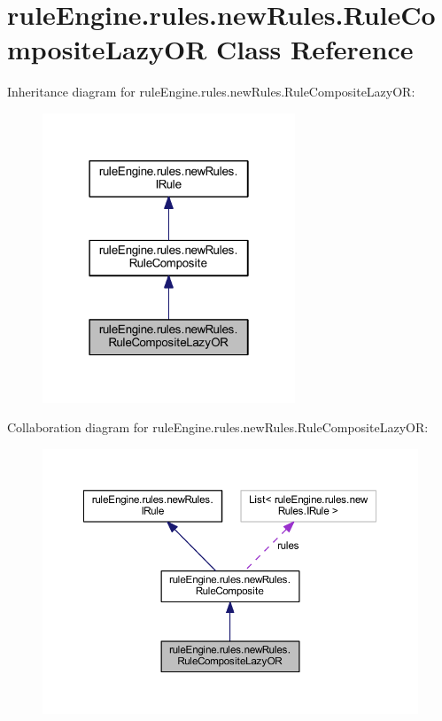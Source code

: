 \hypertarget{classrule_engine_1_1rules_1_1new_rules_1_1_rule_composite_lazy_o_r}{}\section{rule\+Engine.\+rules.\+new\+Rules.\+Rule\+Composite\+Lazy\+OR Class Reference}
\label{classrule_engine_1_1rules_1_1new_rules_1_1_rule_composite_lazy_o_r}


Inheritance diagram for rule\+Engine.\+rules.\+new\+Rules.\+Rule\+Composite\+Lazy\+OR\+:
\nopagebreak
\begin{figure}[H]
\begin{center}
\leavevmode
\includegraphics[width=214pt]{classrule_engine_1_1rules_1_1new_rules_1_1_rule_composite_lazy_o_r__inherit__graph}
\end{center}
\end{figure}


Collaboration diagram for rule\+Engine.\+rules.\+new\+Rules.\+Rule\+Composite\+Lazy\+OR\+:
\nopagebreak
\begin{figure}[H]
\begin{center}
\leavevmode
\includegraphics[width=350pt]{classrule_engine_1_1rules_1_1new_rules_1_1_rule_composite_lazy_o_r__coll__graph}
\end{center}
\end{figure}
